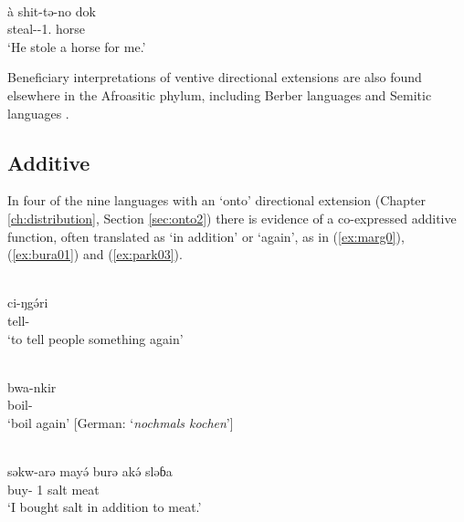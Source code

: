 \ex\label{ex:kana6}
 \\
\gll à	shit-tə-no	dok \\
	steal--1.	horse \\
\glt `He stole a horse for me.'
\z 

Beneficiary interpretations of ventive directional extensions are also found elsewhere in the Afroasitic phylum, including Berber languages \citep{belkadiDeicticDirectionalitySpace2015} and Semitic languages \citep{sjorsMotionVoiceMood2023}. 

\subsection{Additive} \label{sec:additive}

In four of the nine languages with an `onto' directional extension (Chapter \ref{ch:distribution}, Section \ref{sec:onto2}) there is evidence of a co-expressed additive function, often translated as `in addition' or `again', as in (\ref{ex:marg0}), (\ref{ex:bura01}) and (\ref{ex:park03}). 

\ea\label{ex:marg0}
 \\
\gll ci-ŋgə́ri	\\
tell-	\\
\glt `to tell people something again'

\ex\label{ex:bura01}
 \\
\gll bwa-nkir	\\
boil-	\\
\glt `boil again' [German: `\textit{nochmals kochen}']

\ex\label{ex:park03}
 \\
\gll  səkw-arə mayə́ burə akə́ sləɓa	\\
buy- 1 salt  meat	\\
\glt `I bought salt in addition to meat.' 
\z 

